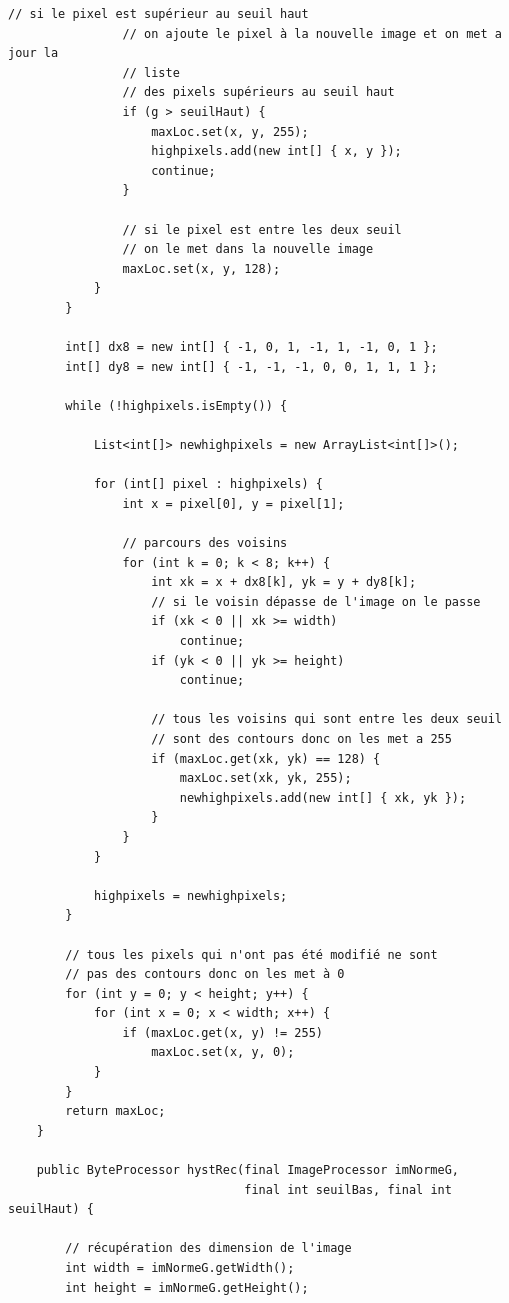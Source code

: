 \documentclass[a4paper,11pt]{article}
\begin{document}
\begin{lstlisting}[caption=Plugin pour le seuillage des maxima locaux par hystérésis]
                // si le pixel est supérieur au seuil haut
                // on ajoute le pixel à la nouvelle image et on met a jour la
                // liste
                // des pixels supérieurs au seuil haut
                if (g > seuilHaut) {
                    maxLoc.set(x, y, 255);
                    highpixels.add(new int[] { x, y });
                    continue;
                }

                // si le pixel est entre les deux seuil
                // on le met dans la nouvelle image
                maxLoc.set(x, y, 128);
            }
        }

        int[] dx8 = new int[] { -1, 0, 1, -1, 1, -1, 0, 1 };
        int[] dy8 = new int[] { -1, -1, -1, 0, 0, 1, 1, 1 };

        while (!highpixels.isEmpty()) {

            List<int[]> newhighpixels = new ArrayList<int[]>();

            for (int[] pixel : highpixels) {
                int x = pixel[0], y = pixel[1];

                // parcours des voisins
                for (int k = 0; k < 8; k++) {
                    int xk = x + dx8[k], yk = y + dy8[k];
                    // si le voisin dépasse de l'image on le passe
                    if (xk < 0 || xk >= width)
                        continue;
                    if (yk < 0 || yk >= height)
                        continue;

                    // tous les voisins qui sont entre les deux seuil
                    // sont des contours donc on les met a 255
                    if (maxLoc.get(xk, yk) == 128) {
                        maxLoc.set(xk, yk, 255);
                        newhighpixels.add(new int[] { xk, yk });
                    }
                }
            }

            highpixels = newhighpixels;
        }

        // tous les pixels qui n'ont pas été modifié ne sont
        // pas des contours donc on les met à 0
        for (int y = 0; y < height; y++) {
            for (int x = 0; x < width; x++) {
                if (maxLoc.get(x, y) != 255)
                    maxLoc.set(x, y, 0);
            }
        }
        return maxLoc;
    }

    public ByteProcessor hystRec(final ImageProcessor imNormeG,
                                 final int seuilBas, final int seuilHaut) {

        // récupération des dimension de l'image
        int width = imNormeG.getWidth();
        int height = imNormeG.getHeight();


\end{lstlisting}
\end{document}
